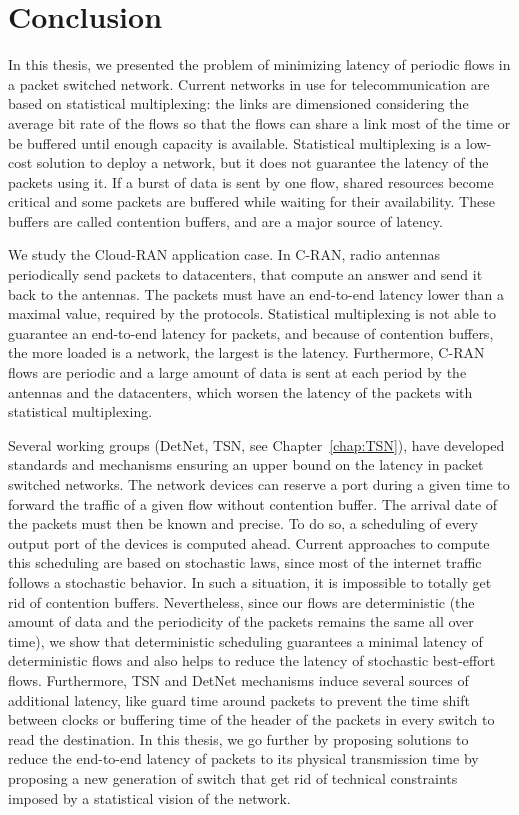 
\chapter*{Conclusion}
\label{chap:concl}

In this thesis, we presented the problem of minimizing latency of periodic flows in a packet switched network. Current networks in use for telecommunication are based on statistical multiplexing: the links are dimensioned considering the average bit rate of the flows so that the flows can share a link most of the time or be buffered until enough capacity is available. Statistical multiplexing is a low-cost solution to deploy a network, but it does not guarantee the latency of the packets using it. If a burst of data is sent by one flow, shared resources become critical and some packets are buffered while waiting for their availability. These buffers are called contention buffers, and are a major source of latency.

We study the Cloud-RAN application case. In C-RAN, radio antennas periodically send packets to datacenters, that compute an answer and send it back to the antennas. The packets must have an end-to-end latency lower than a maximal value, required by the protocols. Statistical multiplexing is not able to guarantee an end-to-end latency for packets, and because of contention buffers, the more loaded is a network, the largest is the latency. Furthermore, C-RAN flows are periodic and a large amount of data is sent at each period by the antennas and the datacenters, which worsen the latency of the packets with statistical multiplexing.

Several working groups (DetNet, TSN, see Chapter~\ref{chap:TSN}), have developed standards and mechanisms ensuring an upper bound on the latency in packet switched networks. The network devices can reserve a port during a given time to forward the traffic of a given flow without contention buffer. The arrival date of the packets must then be known and precise. To do so, a scheduling of every output port of the devices is computed ahead. Current approaches to compute this scheduling are based on stochastic laws, since most of the internet traffic follows a stochastic behavior. In such a situation, it is impossible to totally get rid of contention buffers. Nevertheless, since our flows are deterministic (the amount of data and the periodicity of the packets remains the same all over time), we show that deterministic scheduling guarantees a minimal latency of deterministic flows and also helps to reduce the latency of stochastic best-effort flows. 
Furthermore, TSN and DetNet mechanisms induce several sources of additional latency, like guard time around packets to prevent the time shift between clocks or buffering time of the header of the packets in every switch to read the destination. In this thesis, we go further by proposing solutions to reduce the end-to-end latency of packets to its physical transmission time by proposing a new generation of switch that get rid of technical constraints imposed by a statistical vision of the network.


